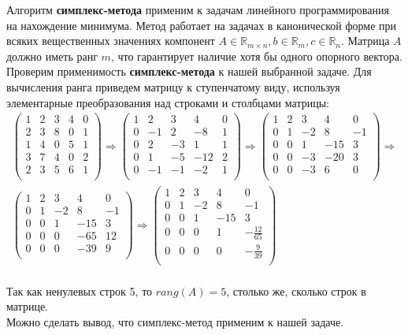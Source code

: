 \documentclass[../body.tex]{subfiles}
\begin{document}
	Алгоритм \textbf{симплекс-метода} применим к задачам линейного программирования на нахождение минимума. Метод работает на задачах в канонической форме при всяких вещественных значениях компонент $ A \in \mathbb{R}_{m\times{n}}, b \in \mathbb{R}_{m}, c \in \mathbb{R}_n $.
	Матрица $A$ должно иметь ранг $m$, что гарантирует наличие хотя бы одного опорного вектора.	
	\vspace{\baselineskip}
	\\Проверим применимость \textbf{симплекс-метода} к нашей выбранной задаче. Для вычисления ранга приведем матрицу к ступенчатому виду, используя элементарные преобразования над строками и столбцами матрицы: 
	\begin{multline}
		\begin{pmatrix}
			1 & 2 & 3 & 4 & 0 \\
			2 & 3 & 8 & 0 & 1 \\
			1 & 4 & 0 & 5 & 1 \\
			3 & 7 & 4 & 0 & 2 \\
			2 & 3 & 5 & 6 & 1 \\
		\end{pmatrix}
	\Longrightarrow
		\begin{pmatrix}
			1 & 2 & 3 & 4 & 0 \\
			0 & -1 & 2 & -8 & 1 \\
			0 & 2 & -3 & 1 & 1 \\
			0 & 1 & -5 & -12 & 2 \\
			0 & -1 & -1 & -2 & 1 \\
		\end{pmatrix}
	\Longrightarrow
	\begin{pmatrix}
		1 & 2 & 3 & 4 & 0 \\
		0 & 1 & -2 & 8 & -1 \\
		0 & 0 & 1 & -15 & 3 \\
		0 & 0 & -3 & -20 & 3 \\
		0 & 0 & -3 & 6 & 0 \\
	\end{pmatrix}
	\Longrightarrow \\
\begin{pmatrix}
	1 & 2 & 3 & 4 & 0 \\
	0 & 1 & -2 & 8 & -1 \\
	0 & 0 & 1 & -15 & 3 \\
	0 & 0 & 0 & -65 & 12 \\
	0 & 0 & 0 & -39 & 9 \\
\end{pmatrix}
\Longrightarrow
\begin{pmatrix}
	1 & 2 & 3 & 4 & 0 \\
	0 & 1 & -2 & 8 & -1 \\
	0 & 0 & 1 & -15 & 3 \\
	0 & 0 & 0 & 1 & -\frac{12}{65} \\
	0 & 0 & 0 & 0 & -\frac{9}{39} \\
\end{pmatrix}
	\end{multline}\\
\vspace{\baselineskip}
Так как ненулевых строк 5, то $rang(A) = 5$, столько же, сколько строк в матрице.\\
\vspace{\baselineskip}
Можно сделать вывод, что симплекс-метод применим к нашей задаче.
\end{document}
